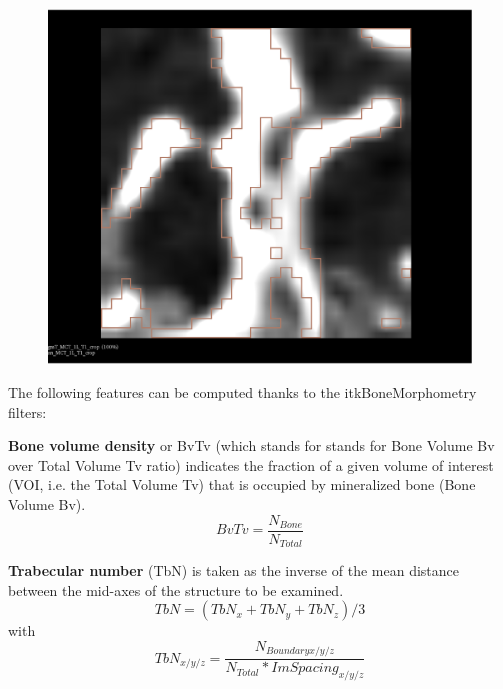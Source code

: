 \documentclass{InsightArticle}
\begin{document}
\begin{figure}[H]
\begin{center}
    \includegraphics[scale=0.115]{figures/Nboundary.eps}
    \label{fig:N}
  \end{center}
\end{figure}

The following features can be computed thanks to the itkBoneMorphometry filters:

\textbf{Bone volume density} or BvTv (which stands for  stands for Bone Volume Bv over Total Volume Tv ratio) indicates the fraction of a given volume of interest (VOI, i.e. the Total Volume Tv) that is occupied by mineralized bone (Bone Volume Bv).
\begin{equation} \label{eqn:BvTv}
BvTv = \frac{N_{Bone}}{N_{Total}}
\end{equation}

\textbf{Trabecular number} (TbN) is taken as the inverse of the mean distance between the mid-axes of the structure to be examined. 
\begin{equation} \label{eqn:TbN}
TbN = (TbN_x + TbN_y + TbN_z) / 3
\end{equation}
with
\begin{equation} \label{eqn:TbNxyz}
TbN_{x/y/z} = \frac{N_{Boundary x/y/z}}{N_{Total}*ImSpacing_{x/y/z}}
\end{equation}
\end{document}
